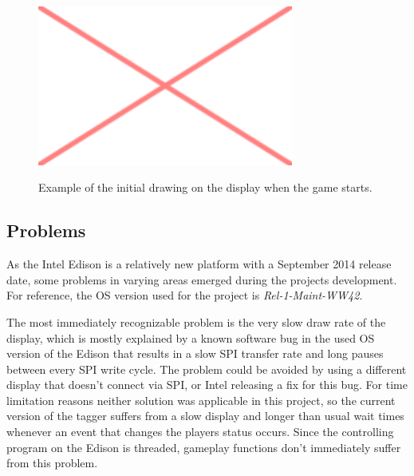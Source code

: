 \begin{figure}[h!]
\centering
\includegraphics[width=0.75\textwidth]{images/placeholder.png}\\
\caption[Edison Tagger Display]{Example of the initial drawing on the display when the game starts.}
\label{fig:tag_ed_dsp}
\end{figure}


\subsection{Problems}
As the Intel Edison is a relatively new platform with a September 2014 release date, some problems in varying areas 
emerged during the projects development. For reference, the OS version used for the project is \textit{Rel-1-Maint-WW42}.

The most immediately recognizable problem is the very slow draw rate of the display, which is mostly explained by a 
known software bug in the used OS version of the Edison that results in a slow SPI transfer rate and long pauses 
between every SPI write cycle. The problem could be avoided by using a different display that doesn't connect via SPI, 
or Intel releasing a fix for this bug. For time limitation reasons neither solution was applicable in this project, so 
the current version of the tagger suffers from a slow display and longer than usual wait times whenever an event that 
changes the players status occurs. Since the controlling program on the Edison is threaded, gameplay functions don't 
immediately suffer from this problem.

